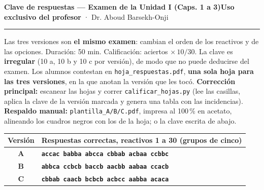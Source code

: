 \documentclass[10pt,letterpaper]{article}
\begin{document}
\small\color{tinta}
{\color{guinda}\textbf{\large Clave de respuestas — Examen de la Unidad I (Caps. 1 a 3)}}\hfill{\footnotesize\textbf{Uso exclusivo del profesor} · Dr. Aboud Barsekh-Onji}
\vspace{2pt}\hrule\vspace{4pt}
Las tres versiones son \textbf{el mismo examen}: cambian el orden de los reactivos y de las opciones. Duración: 50 min. Calificación: aciertos $\times\,10/30$. La clave es \textbf{irregular} (10 a, 10 b y 10 c por versión), de modo que no puede deducirse del examen. Los alumnos contestan en \texttt{hoja\_respuestas.pdf}, \textbf{una sola hoja para las tres versiones}, en la que anotan la versión que les tocó. \textbf{Corrección principal:} escanear las hojas y correr \texttt{calificar\_hojas.py} (lee las casillas, aplica la clave de la versión marcada y genera una tabla con las incidencias). \textbf{Respaldo manual:} \texttt{plantilla\_A/B/C.pdf}, impresa al 100\,\% en acetato, alineando los cuadros negros con los de la hoja; o la clave escrita de abajo.

\vspace{3pt}
\begin{center}\renewcommand{\arraystretch}{1.25}\begin{tabular}{@{}cl@{}}\toprule \textbf{Versión} & \textbf{Respuestas correctas, reactivos 1 a 30 (grupos de cinco)}\\\midrule
\textbf{A} & \texttt{\textbf{accac babba abcca cbbab acbaa ccbbc}}\\
\textbf{B} & \texttt{\textbf{abbca ccbcb baccb aacbb aabaa ccacb}}\\
\textbf{C} & \texttt{\textbf{cbbab caacb bcbcb acbcc aabba acaca}}\\
\bottomrule\end{tabular}\end{center}
\end{document}
